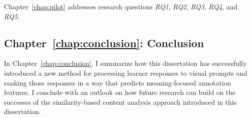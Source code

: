 Chapter~\ref{chap:pilot} addresses research questions \textit{RQ1}, \textit{RQ2}, \textit{RQ3}, \textit{RQ4}, and \textit{RQ5}.


\subsection{Chapter~\ref{chap:conclusion}: Conclusion}
In Chapter~\ref{chap:conclusion}, I summarize how this dissertation has successfully introduced a new method for processing learner responses to visual prompts and ranking those responses in a way that predicts meaning-focused annotation features.
I conclude with an outlook on how future research can build on the successes of the similarity-based content analysis approach introduced in this dissertation.


